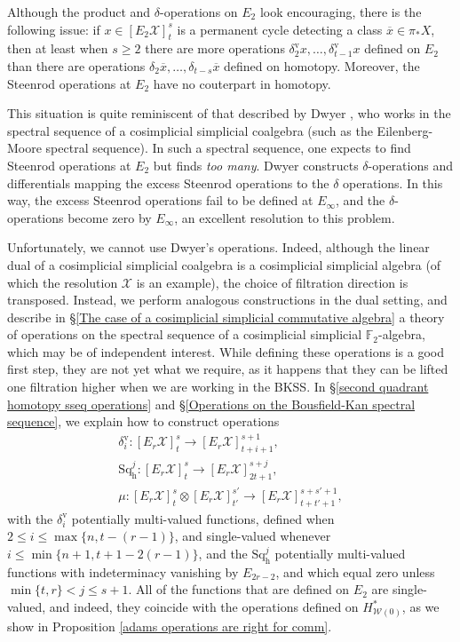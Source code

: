 \documentclass[11pt]{amsart} \renewcommand{\baselinestretch}{1.2}
\theoremstyle{plain}
\numberwithin{equation}{section} %
\theoremstyle{plain}
\numberwithin{equation}{chapter} %
\renewcommand{\to}{\longrightarrow}
\newcommand{\calw}{\mathcal{W}}
\newcommand{\calx}{\mathcal{X}}
\newcommand{\F}{\mathbb{F}}
\newcommand{\E}[5]{[E^{#1}_{#2}#3]^{#4}_{#5}}
\newcommand{\Edownup}[5]{[E_{#1}^{#2}#3]^{#4}_{#5}}
\newcommand{\uver}{^\mathrm{v}}
\newcommand{\dhor}{_\mathrm{h}}
\newcommand{\Sqh}{\mathrm{Sq}\dhor}
\newcommand{\deltav}{\delta\uver}
\newcommand{\BKSS}{BKSS}
\begin{document}
\begin{Introduction}
Although the product and $\delta$-operations on $E_2$ look encouraging, there is the following issue: if $x\in \E{}{2}{\calx}{s}{t}$ is  a permanent cycle detecting  a class $\overline{x}\in \pi_*X$, then at least when $s\geq2$ there are more operations $\deltav_2x,\ldots,\deltav_{t-1}x$ defined on $E_2$ than there are operations $\delta_2\overline{x},\ldots,\delta_{t-s}\overline{x}$ defined on homotopy.  Moreover, the Steenrod operations at $E_2$ have no couterpart in homotopy.

This situation is quite reminiscent of that described by Dwyer \cite{DwyerHigherDividedSquares.pdf}, who works in the spectral sequence of a cosimplicial simplicial coalgebra (such as the Eilenberg-Moore spectral sequence). In such a spectral sequence, one expects to find Steenrod operations at $E_2$ but finds \emph{too many}. Dwyer constructs $\delta$-operations and differentials mapping the excess Steenrod operations to the $\delta$ operations. In this way, the excess Steenrod operations fail to be defined at $E_\infty$, and the $\delta$-operations become zero by $E_\infty$, an excellent resolution to this problem.

Unfortunately, we cannot use Dwyer's operations. Indeed,  although the linear dual of a cosimplicial simplicial coalgebra is a cosimplicial simplicial algebra (of which the resolution $\calx$ is an example), the choice of filtration direction is transposed. Instead, we perform analogous constructions in the dual setting, and describe in \S\ref{The case of a cosimplicial simplicial commutative algebra} a theory of operations on the spectral sequence of a cosimplicial simplicial $\F_2$-algebra, which may be of independent interest. While defining these operations is a good first step, they are not yet what we require, as it happens that they can be lifted one filtration higher  when we are working in the \BKSS. In \S\ref{second quadrant homotopy sseq operations} and \S\ref{Operations on the Bousfield-Kan spectral sequence}, we explain how to construct operations
\begin{gather*}
\deltav_i:\Edownup{r}{}{\calx}{s}{t} \to \Edownup{r}{}{\calx}{s+1}{t+i+1},
\\
\Sqh^j:\Edownup{r}{}{\calx}{s}{t}   \to
\Edownup{r}{}{\calx}{s+j}{2t+1},\\
\mu:\Edownup{r}{}{\calx}{s}{t}\otimes \Edownup{r}{}{\calx}{s'}{t'}\to
\Edownup{r}{}{\calx}{s+s'+1}{t+t'+1},
\end{gather*}
with the $\deltav_i$ potentially multi-valued functions,  defined when $2\leq i\leq \max\{n,t-(r-1)\}$, and single-valued whenever $i\leq\min\{n+1,t+1-2(r-1)\}$, and the $\Sqh^j$ potentially multi-valued functions with indeterminacy vanishing by $E_{2r-2}$, and which equal zero unless $\min\{t,r\}< j\leq s+1$. All of the functions that are  defined on $E_2$ are single-valued, and indeed, they coincide with the operations defined on $H^*_{\calw(0)}$, as we show in Proposition \ref{adams operations are right for comm}.


\end{Introduction}
\end{document}
